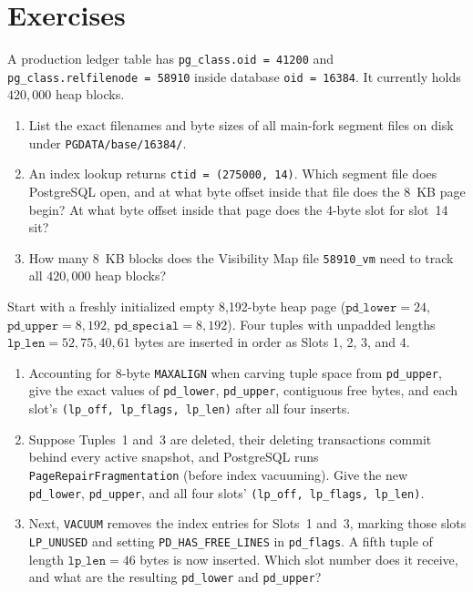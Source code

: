 \section{Exercises}
\label{sec:ch02-exercises}

\begin{exercise}
\label{ex:ch02-seg-math}
A production ledger table has \texttt{pg\_class.oid = 41200} and \texttt{pg\_class.relfilenode = 58910} inside database \texttt{oid = 16384}. It currently holds $420{,}000$ heap blocks.
\begin{enumerate}[label=(\alph*)]
  \item List the exact filenames and byte sizes of all main-fork segment files on disk under \texttt{PGDATA/base/16384/}.
  \item An index lookup returns \texttt{ctid = (275000, 14)}. Which segment file does PostgreSQL open, and at what byte offset inside that file does the 8~KB page begin? At what byte offset inside that page does the 4-byte slot for slot~14 sit?
  \item How many 8~KB blocks does the Visibility Map file \texttt{58910\_vm} need to track all $420{,}000$ heap blocks?
\end{enumerate}
\end{exercise}

\begin{exercise}
\label{ex:ch02-page-trace}
Start with a freshly initialized empty 8,192-byte heap page ($\texttt{pd\_lower} = 24$, $\texttt{pd\_upper} = 8{,}192$, $\texttt{pd\_special} = 8{,}192$). Four tuples with unpadded lengths $\texttt{lp\_len} = 52, 75, 40, 61$ bytes are inserted in order as Slots 1, 2, 3, and 4.
\begin{enumerate}[label=(\alph*)]
  \item Accounting for 8-byte \texttt{MAXALIGN} when carving tuple space from \texttt{pd\_upper}, give the exact values of \texttt{pd\_lower}, \texttt{pd\_upper}, contiguous free bytes, and each slot's \texttt{(lp\_off, lp\_flags, lp\_len)} after all four inserts.
  \item Suppose Tuples~1 and~3 are deleted, their deleting transactions commit behind every active snapshot, and PostgreSQL runs \texttt{PageRepairFragmentation} (before index vacuuming). Give the new \texttt{pd\_lower}, \texttt{pd\_upper}, and all four slots' \texttt{(lp\_off, lp\_flags, lp\_len)}.
  \item Next, \texttt{VACUUM} removes the index entries for Slots~1 and~3, marking those slots \texttt{LP\_UNUSED} and setting \texttt{PD\_HAS\_FREE\_LINES} in \texttt{pd\_flags}. A fifth tuple of length $\texttt{lp\_len} = 46$ bytes is now inserted. Which slot number does it receive, and what are the resulting \texttt{pd\_lower} and \texttt{pd\_upper}?
\end{enumerate}
\end{exercise}


